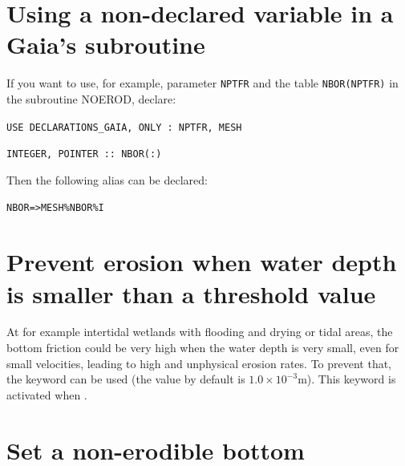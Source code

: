 {\section{Using a non-declared variable in a Gaia's subroutine}
If you want to use, for example, parameter \texttt{NPTFR} and the table \texttt{NBOR(NPTFR)} in the subroutine NOEROD,
declare:

\texttt{USE DECLARATIONS\_GAIA, ONLY : NPTFR, MESH}

\texttt{INTEGER, POINTER :: NBOR(:)}

Then the following alias can be declared:

\texttt{NBOR=>MESH\%NBOR\%I}

\section{Prevent erosion when water depth is smaller than a threshold value}
At for example intertidal wetlands with flooding and drying or tidal areas, the bottom friction could be very high when the water depth is very small, even for small velocities, leading to high and unphysical erosion rates. To prevent that, the keyword  can be used (the value by default is $1.0 \times 10^{-3}$m). This keyword is activated when .

\section{Set a non-erodible bottom}
}
